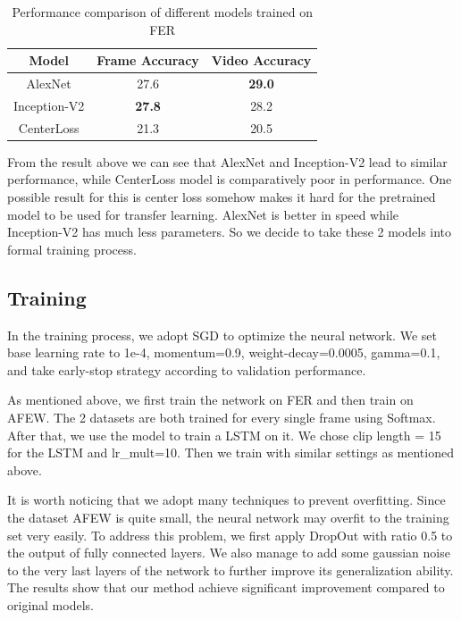 \documentclass[10pt,twocolumn,letterpaper]{article}
\begin{document}
\begin{table}[t]
\begin{center}
\vspace*{5pt}
\begin{tabular}{|c|c|c|}
\hline
\textbf{Model} & \textbf{Frame Accuracy} & \textbf{Video Accuracy} \\
\hline\hline
AlexNet & 27.6 & \textbf{29.0} \\
Inception-V2 & \textbf{27.8} & 28.2 \\
CenterLoss & 21.3 & 20.5 \\ 
\hline
\end{tabular}
\end{center}
\caption{Performance comparison of different models trained on FER}
\label{tableSel}

\end{table}

From the result above we can see that AlexNet and Inception-V2 lead to similar performance, while CenterLoss model is comparatively poor in performance. One possible result for this is center loss somehow makes it hard for the pretrained model to be used for transfer learning. AlexNet is better in speed while Inception-V2 has much less parameters. So we decide to take these 2 models into formal training process.



\subsection{Training}

In the training process, we adopt SGD to optimize the neural network. We set base learning rate to 1e-4, momentum=0.9, weight-decay=0.0005, gamma=0.1, and take early-stop strategy according to validation performance.

As mentioned above, we first train the network on FER and then train on AFEW. The 2 datasets are both trained for every single frame using Softmax. After that, we use the model to train a LSTM on it. We chose clip length = 15 for the LSTM and lr\_mult=10. Then we train with similar settings as mentioned above.

It is worth noticing that we adopt many techniques to prevent overfitting. Since the dataset AFEW is quite small, the neural network may overfit to the training set very easily. To address this problem, we first apply DropOut with ratio 0.5 to the output of fully connected layers. We also manage to add some gaussian noise to the very last layers of the network to further improve its generalization ability. The results show that our method achieve significant improvement compared to original models.
\end{document}
